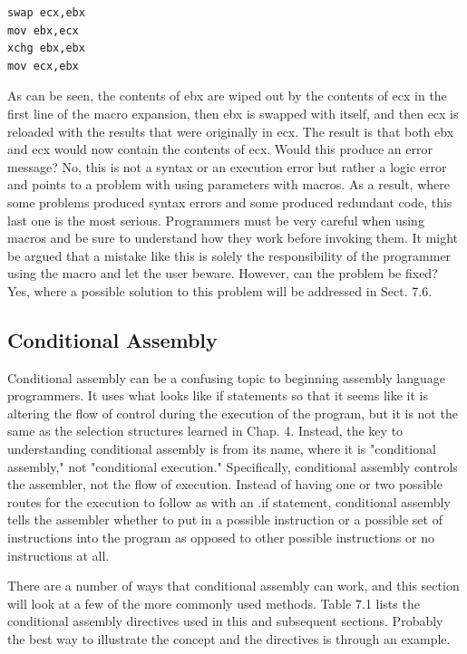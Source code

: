 \documentclass[10pt]{book}
\begin{document}
\begin{verbatim}
swap ecx,ebx
mov ebx,ecx
xchg ebx,ebx
mov ecx,ebx
\end{verbatim}

As can be seen, the contents of ebx are wiped out by the contents of ecx in the first line of the macro expansion, then ebx is swapped with itself, and then ecx is reloaded with the results that were originally in ecx. The result is that both ebx and ecx would now contain the contents of ecx. Would this produce an error message? No, this is not a syntax or an execution error but rather a logic error and points to a problem with using parameters with macros. As a result, where some problems produced syntax errors and some produced redundant code, this last one is the most serious. Programmers must be very careful when using macros and be sure to understand how they work before invoking them. It might be argued that a mistake like this is solely the responsibility of the programmer using the macro and let the user beware. However, can the problem be fixed? Yes, where a possible solution to this problem will be addressed in Sect. 7.6.


\subsection{Conditional Assembly}
Conditional assembly can be a confusing topic to beginning assembly language programmers. It uses what looks like if statements so that it seems like it is altering the flow of control during the execution of the program, but it is not the same as the selection structures learned in Chap. 4. Instead, the key to understanding conditional assembly is from its name, where it is "conditional assembly," not "conditional execution." Specifically, conditional assembly controls the assembler, not the flow of execution. Instead of having one or two possible routes for the execution to follow as with an .if statement, conditional assembly tells the assembler whether to put in a possible instruction or a possible set of instructions into the program as opposed to other possible instructions or no instructions at all.

There are a number of ways that conditional assembly can work, and this section will look at a few of the more commonly used methods. Table 7.1 lists the conditional assembly directives used in this and subsequent sections. Probably the best way to illustrate the concept and the directives is through an example.
\end{document}
